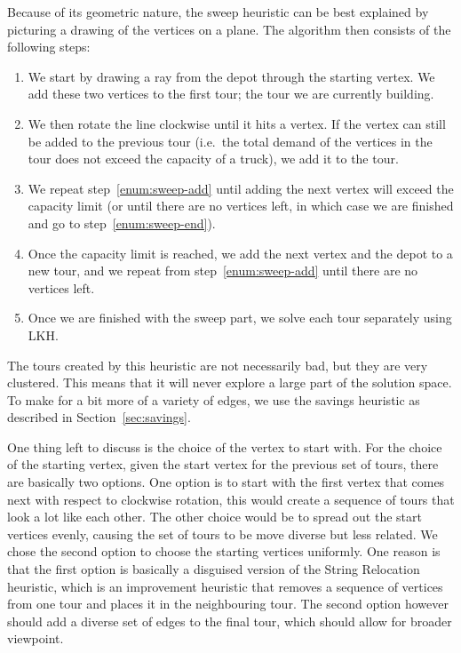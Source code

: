 \documentclass[12pt]{article}
\begin{document}
    Because of its geometric nature, the sweep heuristic can be best explained by picturing a
    drawing of the vertices on a plane. The algorithm then consists of the following steps:
    \begin{enumerate}
        \itemsep 0em
        \item
            We start by drawing a ray from the depot through the starting vertex. We add these two
            vertices to the first tour; the tour we are currently building.
        \item
        \label{enum:sweep-add}
            We then rotate the line clockwise until it hits a vertex. If the vertex can still be
            added to the previous tour (i.e.\ the total demand of the vertices in the tour does not
            exceed the capacity of a truck), we add it to the tour.
        \item
            We repeat step~\ref{enum:sweep-add} until adding the next vertex will exceed the
            capacity limit (or until there are no vertices left, in which case we are finished and
            go to step~\ref{enum:sweep-end}).
        \item
            Once the capacity limit is reached, we add the next vertex and the depot to a new tour,
            and we repeat from step~\ref{enum:sweep-add} until there are no vertices left.
        \item
        \label{enum:sweep-end}
            Once we are finished with the sweep part, we solve each tour separately using LKH.
    \end{enumerate}

    The tours created by this heuristic are not necessarily bad, but they are very clustered. This
    means that it will never explore a large part of the solution space. To make for a bit more of a
    variety of edges, we use the savings heuristic as described in Section~\ref{sec:savings}.

    One thing left to discuss is the choice of the vertex to start with. For the choice of the
    starting vertex, given the start vertex for the previous set of tours, there are basically two
    options.
    One option is to start with the first vertex that comes next with respect to clockwise
    rotation, this would create a sequence of tours that look a lot like each other. The other
    choice would be to spread out the start vertices evenly, causing the set of tours to be move
    diverse but less related.
    We chose the second option to choose the starting vertices uniformly. One reason is that the
    first option is basically a disguised version of the String Relocation heuristic, which is an
    improvement heuristic that removes a sequence of vertices from one tour and places it in the
    neighbouring tour. The second option however should add a diverse set of edges to the final
    tour, which should allow for broader viewpoint.
\end{document}
